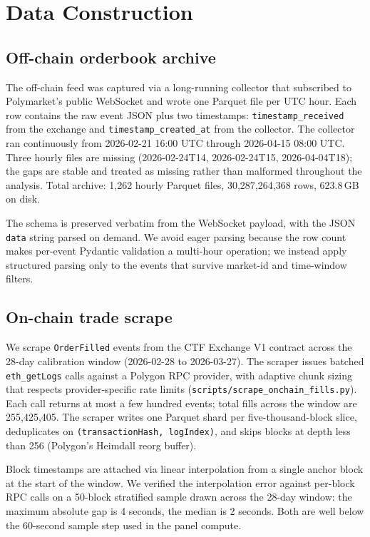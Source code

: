 \section{Data Construction}\label{sec:dataconstruction}

\subsection{Off-chain orderbook archive}

The off-chain feed was captured via a long-running collector that
subscribed to Polymarket's public WebSocket and wrote one Parquet
file per UTC hour. Each row contains the raw event JSON plus two
timestamps: \texttt{timestamp\_received} from the exchange and
\texttt{timestamp\_created\_at} from the collector. The collector
ran continuously from 2026-02-21 16:00 UTC through 2026-04-15 08:00
UTC. Three hourly files are missing
(2026-02-24T14, 2026-02-24T15, 2026-04-04T18); the gaps are stable
and treated as missing rather than malformed throughout the
analysis. Total archive: 1{,}262 hourly Parquet files,
30{,}287{,}264{,}368 rows, 623.8\,GB on disk.

The schema is preserved verbatim from the WebSocket payload, with
the JSON \texttt{data} string parsed on demand. We avoid eager
parsing because the row count makes per-event Pydantic validation a
multi-hour operation; we instead apply structured parsing only to
the events that survive market-id and time-window filters.

\subsection{On-chain trade scrape}

We scrape \texttt{OrderFilled} events from the CTF Exchange V1
contract across the 28-day calibration window (2026-02-28 to
2026-03-27). The scraper issues batched \texttt{eth\_getLogs} calls
against a Polygon RPC provider, with adaptive chunk sizing that
respects provider-specific rate limits
(\texttt{scripts/scrape\_onchain\_fills.py}). Each call returns at
most a few hundred events; total fills across the window are
255{,}425{,}405. The scraper writes one Parquet shard per
five-thousand-block slice, deduplicates on
\texttt{(transactionHash, logIndex)}, and skips blocks at
depth less than 256 (Polygon's Heimdall reorg buffer).

Block timestamps are attached via linear interpolation from a single
anchor block at the start of the window. We verified the
interpolation error against per-block RPC calls on a 50-block
stratified sample drawn across the 28-day window: the maximum
absolute gap is 4 seconds, the median is 2 seconds. Both are well
below the 60-second sample step used in the panel compute.

